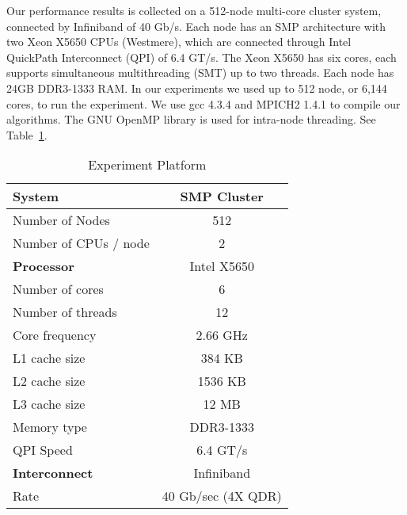 \documentclass[conference]{IEEEtran}
\begin{document}
Our performance results is collected on a 512-node multi-core cluster system,
connected by Infiniband of 40 Gb/s. Each node has an SMP architecture with two
Xeon X5650 CPUs (Westmere), which are connected through Intel QuickPath
Interconnect (QPI) of 6.4 GT/s. The Xeon X5650 has six cores, each supports
simultaneous multithreading (SMT) up to two threads. Each node has 24GB
DDR3-1333 RAM. In our experiments we used up to 512 node, or 6,144 cores, to
run the experiment. We use gcc 4.3.4 and MPICH2 1.4.1 to compile our
algorithms. The GNU OpenMP library is used for intra-node threading. See
Table~\ref{table:platform}.

\begin{table}[t]
  \caption{Experiment Platform}
  \label{table:platform}
  \begin{center}
    \begin{tabular}{lc}
      \toprule \textbf{System} &  SMP Cluster\\\midrule
      Number of Nodes & 512 \\
      Number of CPUs / node & 2 \\\bottomrule
      \textbf{Processor} & Intel X5650 \\\midrule
      Number of cores & 6 \\
      Number of threads & 12 \\
      Core frequency & 2.66 GHz \\
      L1 cache size &  384 KB \\
      L2 cache size & 1536 KB \\
      L3 cache size & 12 MB \\
      Memory type & DDR3-1333 \\
      QPI Speed & 6.4 GT/s \\\bottomrule
      \textbf{Interconnect} & Infiniband \\\midrule
      Rate & 40 Gb/sec (4X QDR) \\\bottomrule
    \end{tabular}
  \end{center}
\end{table}
\end{document}
